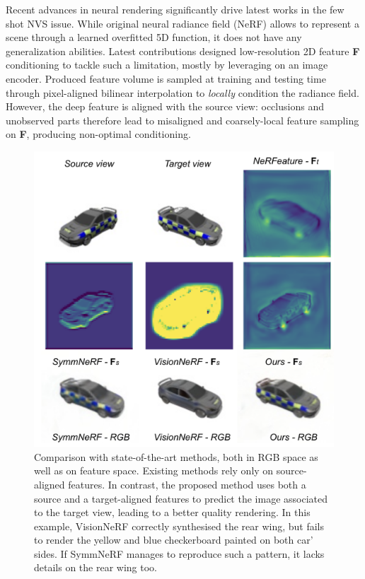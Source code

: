 Recent advances in neural rendering \citep{tewari2022advances} significantly drive latest works in the few shot NVS issue. While original neural radiance field (NeRF) \citep{mildenhall2020nerf} allows to represent a scene through a learned overfitted 5D function, it does not have any generalization abilities. Latest contributions \citep{yu2021pixelnerf,li2022symmnerf,lin2023vision} designed low-resolution 2D feature \textbf{F} conditioning to tackle such a limitation, mostly by leveraging on an image encoder. Produced feature volume is sampled at training and testing time through pixel-aligned bilinear interpolation to \textit{locally} condition the radiance field. However, the deep feature is aligned with the source view: occlusions and unobserved parts therefore lead to misaligned and coarsely-local feature sampling on \textbf{F}, producing non-optimal conditioning. 

\begin{figure}[htp!]
    \center
  \includegraphics[width=.65\textwidth]{images/epinerf/abstract_figure.png}
  \caption{Comparison with state-of-the-art methods, both in RGB space as well as on feature space. Existing methods rely only on source-aligned features. In contrast, the proposed method uses both a source and a target-aligned features to predict the image associated to the target view, leading to a better quality rendering. In this example, VisionNeRF \citep{lin2023vision} correctly synthesised the rear wing, but fails to render the yellow and blue checkerboard painted on both car' sides. If SymmNeRF \citep{li2022symmnerf} manages to reproduce such a pattern, it lacks details on the rear wing too.}
  \label{fig:res_car_intro}
\end{figure}

